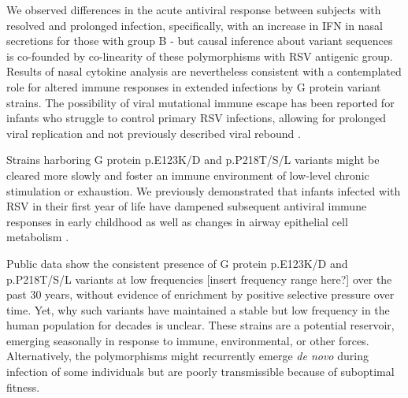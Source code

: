 \documentclass{article} %
\begin{document}
We observed differences in the acute antiviral response between subjects with resolved and prolonged infection, specifically, with an increase in IFN in nasal secretions for those with group B - but causal inference about variant sequences is co-founded by co-linearity of these polymorphisms with RSV antigenic group. Results of nasal cytokine analysis are nevertheless consistent with a contemplated role for altered immune responses in extended infections by G protein variant strains. 
The possibility of viral mutational immune escape has been reported for 
infants who struggle to control primary RSV infections, allowing for prolonged viral replication and not previously described viral rebound
\citep{brint2017prolonged}.

Strains harboring G protein p.E123K/D and p.P218T/S/L variants might be cleared more slowly and foster an immune environment of low-level chronic stimulation or exhaustion. 
We previously demonstrated that infants infected with RSV in their first year of life have dampened subsequent antiviral immune responses in early childhood \citep{chirkova2022effect} as well as changes in airway epithelial cell metabolism \citep{connelly2021metabolic}.

Public data show the consistent presence of G protein p.E123K/D and p.P218T/S/L variants at low frequencies [insert frequency range here?] over the past 30 years, without evidence of enrichment by positive selective pressure over time. Yet, why such variants have maintained a stable but low frequency in the human population for decades is unclear. These strains are a potential reservoir, emerging seasonally in response to immune, environmental, or other forces. Alternatively, the polymorphisms might recurrently emerge \textit{de novo} during infection of some individuals but are poorly transmissible because of suboptimal fitness. 
\end{document}
